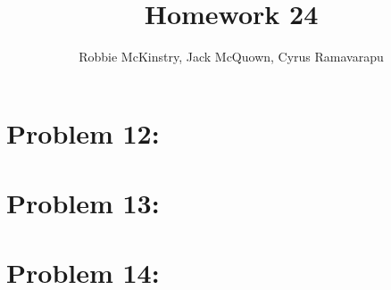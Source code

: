 \documentclass[12pt]{article}
\begin{document}
\title{Homework 24}
\author{Robbie McKinstry, Jack McQuown, Cyrus Ramavarapu}
\renewcommand{\today}{27 October 2016}
\renewcommand{\baselinestretch}{1.5}
\maketitle

\section*{Problem 12: }
\section*{Problem 13: }
\section*{Problem 14: }
\end{document}
